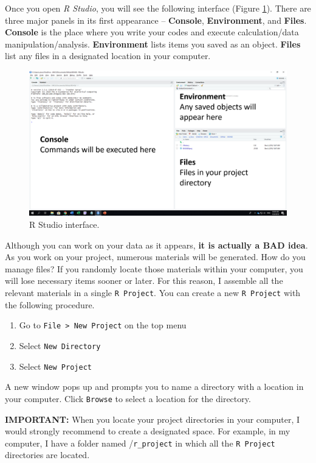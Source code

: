 \documentclass[
]{book}
\providecommand{\tightlist}{%
  \setlength{\itemsep}{0pt}\setlength{\parskip}{0pt}}
\begin{document}
Once you open \emph{R Studio}, you will see the following interface (Figure \ref{fig:ui}). There are three major panels in its first appearance -- \textbf{Console}, \textbf{Environment}, and \textbf{Files}. \textbf{Console} is the place where you write your codes and execute calculation/data manipulation/analysis. \textbf{Environment} lists items you saved as an object. \textbf{Files} list any files in a designated location in your computer.

\begin{figure}
\includegraphics[width=27.78in]{image/r_image01} \caption{R Studio interface.}\label{fig:ui}
\end{figure}

Although you can work on your data as it appears, \textbf{it is actually a BAD idea}. As you work on your project, numerous materials will be generated. How do you manage files? If you randomly locate those materials within your computer, you will lose necessary items sooner or later. For this reason, I assemble all the relevant materials in a single \texttt{R\ Project}. You can create a new \texttt{R\ Project} with the following procedure.

\begin{enumerate}
\def\labelenumi{\alph{enumi}.}
\tightlist
\item
  Go to \texttt{File\ \textgreater{}\ New\ Project} on the top menu
\item
  Select \texttt{New\ Directory}
\item
  Select \texttt{New\ Project}
\end{enumerate}

A new window pops up and prompts you to name a directory with a location in your computer. Click \texttt{Browse} to select a location for the directory.

\textbf{IMPORTANT:} When you locate your project directories in your computer, I would strongly recommend to create a designated space. For example, in my computer, I have a folder named /\texttt{r\_project} in which all the \texttt{R\ Project} directories are located.
\end{document}
